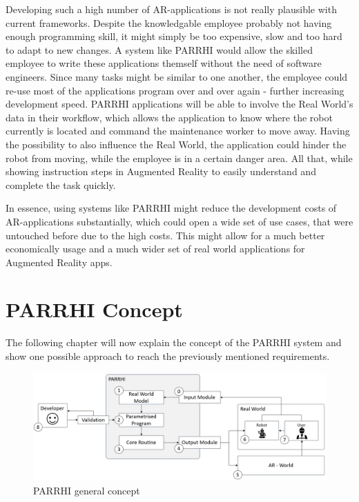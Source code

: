 Developing such a high number of AR-applications is not really plausible with current frameworks. Despite the knowledgable employee probably not having enough programming skill, it might simply be too expensive, slow and too hard to adapt to new changes. A system like PARRHI would allow the skilled employee to write these applications themself without the need of software engineers. Since many tasks might be similar to one another, the employee could re-use most of the applications program over and over again - further increasing development speed. PARRHI applications will be able to involve the Real World's data in their workflow, which allows the application to know where the robot currently is located and command the maintenance worker to move away. Having the possibility to also influence the Real World, the application could hinder the robot from moving, while the employee is in a certain danger area. All that, while showing instruction steps in Augmented Reality to easily understand and complete the task quickly.

In essence, using systems like PARRHI might reduce the development costs of AR-applications substantially, which could open a wide set of use cases, that were untouched before due to the high costs. This might allow for a much better economically usage and a much wider set of real world applications for Augmented Reality apps. 

\clearpage
\section{PARRHI Concept}

The following chapter will now explain the concept of the PARRHI system and show one possible approach to reach the previously mentioned requirements.

\begin{figure}[h]
	\centering
	\includegraphics[width=1\textwidth]{Figures/PARRHIConcept03.jpg}
	\caption{PARRHI general concept}
	\label{Fig:PARRHIConcept}
\end{figure}

